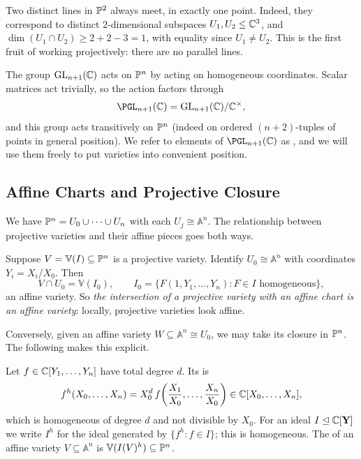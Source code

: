 \documentclass[a4paper]{scrartcl}
\newcommand{\A}{\mathbb{A}}
\newcommand{\V}{\mathbb{V}}
\begin{document}
\begin{example}
	Two distinct lines in $\mathbb{P}^2$ always meet, in exactly one point. Indeed, they correspond to distinct $2$-dimensional subspaces $U_1, U_2 \leq \mathbb{C}^3$, and $\dim(U_1 \cap U_2) \geq 2 + 2 - 3 = 1$, with equality since $U_1 \neq U_2$. This is the first fruit of working projectively: there are no parallel lines.
\end{example}

The group $\operatorname{GL}_{n+1}(\mathbb{C})$ acts on $\mathbb{P}^n$ by acting on homogeneous coordinates. Scalar matrices act trivially, so the action factors through
$$\PGL_{n+1}(\C) = \GL_{n+1}(\C)/\C^\times,$$
and this group acts transitively on $\mathbb{P}^n$ (indeed on ordered $(n+2)$-tuples of points in general position). We refer to elements of $\PGL_{n+1}(\C)$ as , and we will use them freely to put varieties into convenient position.

\subsection{Affine Charts and Projective Closure}

We have $\mathbb{P}^n = U_0 \cup \cdots \cup U_n$ with each $U_j \cong \A^n$. The relationship between projective varieties and their affine pieces goes both ways.

Suppose $V = \V(I) \subseteq \PP^n$ is a projective variety. Identify $U_0 \cong \A^n$ with coordinates $Y_i = X_i/X_0$. Then
$$V \cap U_0 = \V(I_0), \qquad I_0 = \{F(1,Y_1,\dots,Y_n) : F \in I \text{ homogeneous}\},$$
an affine variety. So \emph{the intersection of a projective variety with an affine chart is an affine variety}: locally, projective varieties look affine.

Conversely, given an affine variety $W \subseteq \A^n \cong U_0$, we may take its closure in $\mathbb{P}^n$. The following makes this explicit.

\begin{definition}[Homogenisation]
	Let $f \in \mathbb{C}[Y_1,\dots,Y_n]$ have total degree $d$. Its  is
	$$f^h(X_0,\dots,X_n) = X_0^{d}\, f\!\left(\frac{X_1}{X_0},\dots,\frac{X_n}{X_0}\right) \in \mathbb{C}[X_0,\dots,X_n],$$
	which is homogeneous of degree $d$ and not divisible by $X_0$. For an ideal $I \trianglelefteq \mathbb{C}[\mathbf Y]$ we write $I^h$ for the ideal generated by $\{f^h : f \in I\}$; this is homogeneous. The  of an affine variety $V \subseteq \A^n$ is $\V(I(V)^h) \subseteq \PP^n$.
\end{definition}
\end{document}
